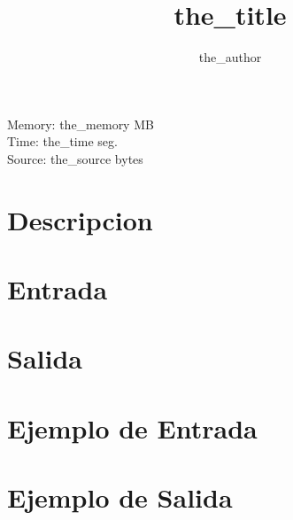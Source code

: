 \documentclass{article}
\title{\textbf{the_title}}
\author{the_author}
\begin{document}
\maketitle
\begin{center}
Memory: the_memory MB\\
Time: the_time seg.\\
Source: the_source bytes\\
\end{center}
\section*{Descripcion}

\section*{Entrada}

\section*{Salida}

\section*{Ejemplo de Entrada}
\texttt{}
\section*{Ejemplo de Salida}
\texttt{}
\end{document}
